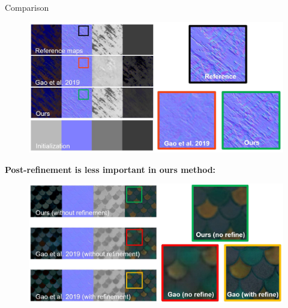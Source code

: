 \documentclass[final]{beamer}
\newlength{\twocolwid}
\begin{document}
\begin{frame}[t]
\begin{columns}[t]
\begin{column}{\twocolwid}
\begin{block}{Comparison}
			\begin{figure}
				\centering
				\includegraphics[width=14in]{results/init.jpg}
			\end{figure}
            
            \vspace{1cm}

            \large{\textbf{Post-refinement is less important in ours method:}}

			\begin{figure}
				\centering
				\includegraphics[width=14in]{results/post.jpg}
			\end{figure}

        \end{block}
    \end{column}
    

\end{columns}
\end{frame}
\end{document}
